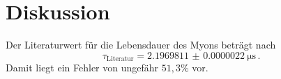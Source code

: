 \section{Diskussion}
\label{sec:Diskussion}
Der Literaturwert für die Lebensdauer des Myons beträgt nach \cite{myon}
\begin{equation*}
	\tau_\text{Literatur} = \SI{2.1969811(22)}{\micro\second}\, \mathrm{.}
\end{equation*}
Damit liegt ein Fehler von ungefähr $51,3 \%$ vor.
